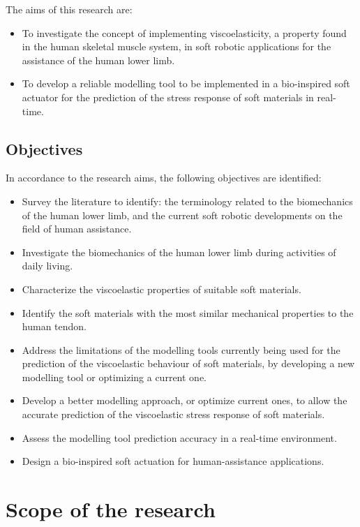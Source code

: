 The aims of this research are:

\begin{itemize}
    \item To investigate the concept of implementing viscoelasticity, a property found in the human skeletal muscle system, in soft robotic applications for the assistance of the human lower limb.
    \item To develop a reliable modelling tool to be implemented in a bio-inspired soft actuator for the prediction of the stress response of soft materials in real-time.
\end{itemize}

\subsection{Objectives}

In accordance to the research aims, the following objectives are identified:

\begin{itemize}
    \item Survey the literature to identify: the terminology related to the biomechanics of the human lower limb, and the current soft robotic developments on the field of human assistance.
    \item Investigate the biomechanics of the human lower limb during activities of daily living.
    \item Characterize the viscoelastic properties of suitable soft materials.
    \item Identify the soft materials with the most similar mechanical properties to the human tendon.
    \item Address the limitations of the modelling tools currently being used for the prediction of the viscoelastic behaviour of soft materials, by developing a new modelling tool or optimizing a current one.
    \item Develop a better modelling approach, or optimize current ones, to allow the accurate prediction of the viscoelastic stress response of soft materials.
    \item Assess the modelling tool prediction accuracy in a real-time environment.
    \item Design a bio-inspired soft actuation for human-assistance applications.
\end{itemize}

\section{Scope of the research}

